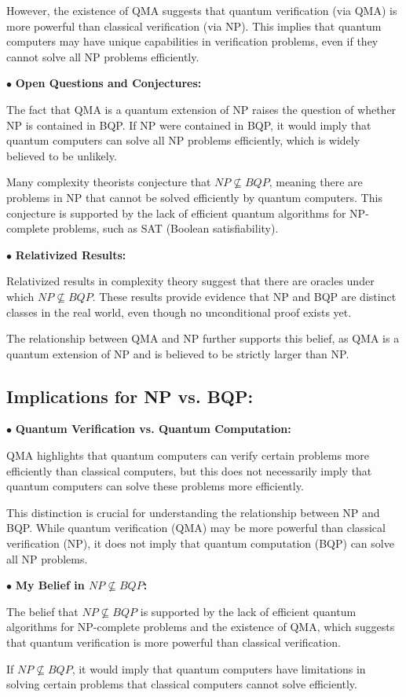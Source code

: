 \documentclass[a4paper]{article}
\begin{document}
However, the existence of QMA suggests that quantum verification (via QMA) is more powerful than classical verification (via NP). This implies that quantum computers may have unique capabilities in verification problems, even if they cannot solve all NP problems efficiently. 

\noindent $\bullet$ \textbf{  Open Questions and Conjectures:}

The fact that QMA is a quantum extension of NP raises the question of whether NP is contained in BQP. If NP were contained in BQP, it would imply that quantum computers can solve all NP problems efficiently, which is widely believed to be unlikely.

Many complexity theorists conjecture that $NP \nsubseteq  BQP$, meaning there are problems in NP that cannot be solved efficiently by quantum computers. This conjecture is supported by the lack of efficient quantum algorithms for NP-complete problems, such as SAT (Boolean satisfiability).

\noindent $\bullet$ \textbf{  Relativized Results:}

Relativized results in complexity theory suggest that there are oracles under which $NP \nsubseteq  BQP$. These results provide evidence that NP and BQP are distinct classes in the real world, even though no unconditional proof exists yet.

The relationship between QMA and NP further supports this belief, as QMA is a quantum extension of NP and is believed to be strictly larger than NP.

\subsection{Implications for NP vs. BQP:}
\noindent $\bullet$ \textbf{Quantum Verification vs. Quantum Computation:}

QMA highlights that quantum computers can verify certain problems more efficiently than classical computers, but this does not necessarily imply that quantum computers can solve these problems more efficiently.

This distinction is crucial for understanding the relationship between NP and BQP. While quantum verification (QMA) may be more powerful than classical verification (NP), it does not imply that quantum computation (BQP) can solve all NP problems.

\noindent $\bullet$ \textbf{My Belief in $NP \nsubseteq  BQP$:}

The belief that $NP \nsubseteq  BQP$ is supported by the lack of efficient quantum algorithms for NP-complete problems and the existence of QMA, which suggests that quantum verification is more powerful than classical verification.

If $NP \nsubseteq  BQP$, it would imply that quantum computers have limitations in solving certain problems that classical computers cannot solve efficiently.
\end{document}
